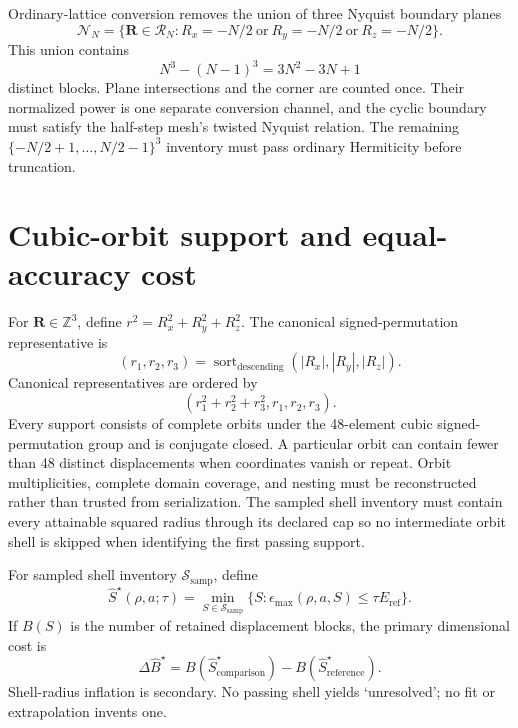 \documentclass[11pt]{article}
\newcommand{\Z}{\mathbb Z}
\begin{document}
Ordinary-lattice conversion removes the union of three Nyquist boundary planes
\begin{equation}
 \mathcal N_N=
 \{\mathbf R\in\mathcal R_N:
 R_x=-N/2\ \text{or}\ R_y=-N/2\ \text{or}\ R_z=-N/2\}.
 \label{eq:nyquist}
\end{equation}
This union contains
\begin{equation}
 N^3-(N-1)^3=3N^2-3N+1
\end{equation}
distinct blocks. Plane intersections and the corner are counted once. Their normalized
power is one separate conversion channel, and the cyclic boundary must satisfy the
half-step mesh's twisted Nyquist relation. The remaining
$\{-N/2+1,\ldots,N/2-1\}^3$ inventory must pass ordinary Hermiticity before truncation.

\section{Cubic-orbit support and equal-accuracy cost}

For $\mathbf R\in\Z^3$, define $r^2=R_x^2+R_y^2+R_z^2$. The canonical signed-permutation
representative is
\begin{equation}
 (r_1,r_2,r_3)=\operatorname{sort}_{\mathrm{descending}}
 (|R_x|,|R_y|,|R_z|).
\end{equation}
Canonical representatives are ordered by
\begin{equation}
 (r_1^2+r_2^2+r_3^2,r_1,r_2,r_3).
\end{equation}
Every support consists of complete orbits under the 48-element cubic signed-permutation
group and is conjugate closed. A particular orbit can contain fewer than 48 distinct
displacements when coordinates vanish or repeat. Orbit multiplicities, complete domain
coverage, and nesting must be reconstructed rather than trusted from serialization. The
sampled shell inventory must contain every attainable squared radius through its declared
cap so no intermediate orbit shell is skipped when identifying the first passing
support.

For sampled shell inventory $\mathcal S_{\mathrm{samp}}$, define
\begin{equation}
 \widehat S^\star(\rho,a;\tau)=
 \min_{S\in\mathcal S_{\mathrm{samp}}}
 \{S:\epsilon_{\max}(\rho,a,S)\le\tau E_{\mathrm{ref}}\}.
\end{equation}
If $B(S)$ is the number of retained displacement blocks, the primary dimensional cost
is
\begin{equation}
 \Delta\widehat B^\star=
 B(\widehat S_{\mathrm{comparison}}^\star)
 -B(\widehat S_{\mathrm{reference}}^\star).
 \label{eq:block-inflation}
\end{equation}
Shell-radius inflation is secondary. No passing shell yields `unresolved'; no fit or
extrapolation invents one.
\end{document}
